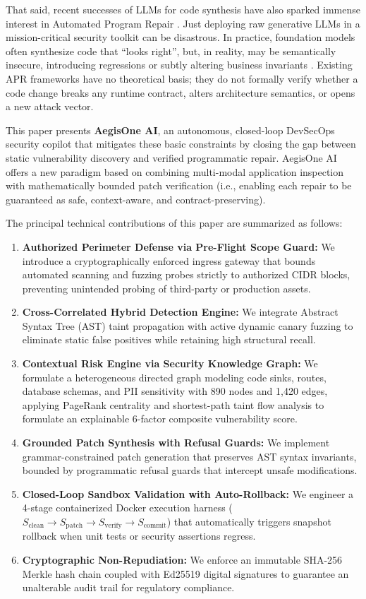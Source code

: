 \documentclass[journal,twoside]{IEEEtran}
\begin{document}
That said, recent successes of LLMs for code synthesis have also sparked immense interest in Automated Program Repair \cite{xia2023automated, fan2023automated}. Just deploying raw generative LLMs in a mission-critical security toolkit can be disastrous. In practice, foundation models often synthesize code that ``looks right'', but, in reality, may be semantically insecure, introducing regressions or subtly altering business invariants \cite{pearce2025asleep, sandoval2023lost}. Existing APR frameworks have no theoretical basis; they do not formally verify whether a code change breaks any runtime contract, alters architecture semantics, or opens a new attack vector.

This paper presents \textbf{AegisOne AI}, an autonomous, closed-loop DevSecOps security copilot that mitigates these basic constraints by closing the gap between static vulnerability discovery and verified programmatic repair. AegisOne AI offers a new paradigm based on combining multi-modal application inspection with mathematically bounded patch verification (i.e., enabling each repair to be guaranteed as safe, context-aware, and contract-preserving).

The principal technical contributions of this paper are summarized as follows:
\begin{enumerate}
    \item \textbf{Authorized Perimeter Defense via Pre-Flight Scope Guard:} We introduce a cryptographically enforced ingress gateway that bounds automated scanning and fuzzing probes strictly to authorized CIDR blocks, preventing unintended probing of third-party or production assets.
    \item \textbf{Cross-Correlated Hybrid Detection Engine:} We integrate Abstract Syntax Tree (AST) taint propagation with active dynamic canary fuzzing to eliminate static false positives while retaining high structural recall.
    \item \textbf{Contextual Risk Engine via Security Knowledge Graph:} We formulate a heterogeneous directed graph modeling code sinks, routes, database schemas, and PII sensitivity with 890 nodes and 1,420 edges, applying PageRank centrality and shortest-path taint flow analysis to formulate an explainable 6-factor composite vulnerability score.
    \item \textbf{Grounded Patch Synthesis with Refusal Guards:} We implement grammar-constrained patch generation that preserves AST syntax invariants, bounded by programmatic refusal guards that intercept unsafe modifications.
    \item \textbf{Closed-Loop Sandbox Validation with Auto-Rollback:} We engineer a 4-stage containerized Docker execution harness ($S_{\text{clean}} \to S_{\text{patch}} \to S_{\text{verify}} \to S_{\text{commit}}$) that automatically triggers snapshot rollback when unit tests or security assertions regress.
    \item \textbf{Cryptographic Non-Repudiation:} We enforce an immutable SHA-256 Merkle hash chain coupled with Ed25519 digital signatures to guarantee an unalterable audit trail for regulatory compliance.
\end{enumerate}
\end{document}

